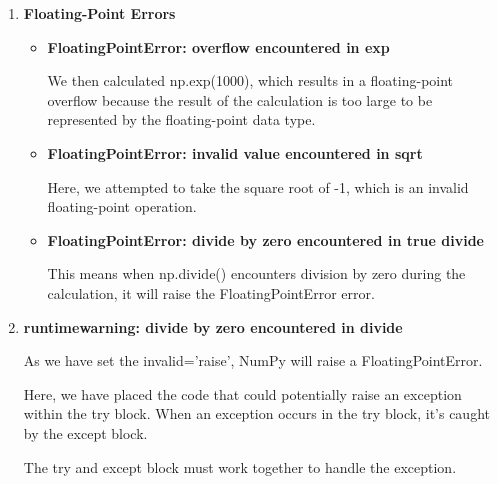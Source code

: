 		\begin{enumerate}
		
			\item \textbf{Floating-Point Errors}
		
				\begin{itemize}
			
					\item \textbf{FloatingPointError: overflow encountered in exp}
					
					We then calculated np.exp(1000), which results in a floating-point overflow because the result of the calculation is too large to be represented by the floating-point data type.
					
					\item \textbf{FloatingPointError: invalid value encountered in sqrt}
					
					Here, we attempted to take the square root of -1, which is an invalid floating-point operation.
					
					\item \textbf{FloatingPointError: divide by zero encountered in true divide}
					
					This means when np.divide() encounters division by zero during the calculation, it will raise the FloatingPointError error.
			
				\end{itemize}
		
			\item \textbf{runtimewarning: divide by zero encountered in divide}
		
			As we have set the invalid='raise', NumPy will raise a FloatingPointError.
			
			Here, we have placed the code that could potentially raise an exception within the try block. When an exception occurs in the try block, it's caught by the except block.
			
			The try and except block must work together to handle the exception.
		
	\end{enumerate}
	

